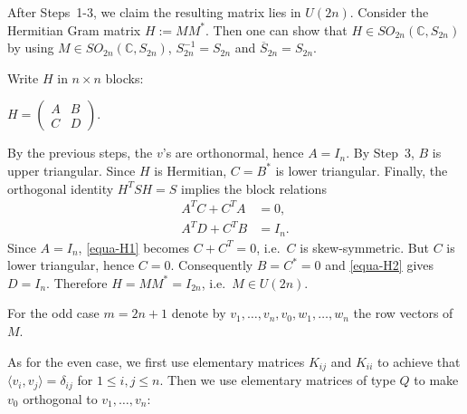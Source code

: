 \documentclass[11pt]{amsart}
\newtheorem{lemma}[theorem]{Lemma}
\theoremstyle{definition}
\theoremstyle{remark}
\theoremstyle{remark}
\begin{document}
After Steps~1-3, we claim the resulting matrix lies in $U(2n)$.
Consider the Hermitian Gram matrix $H:=MM^\ast.$
Then one can show that $H\in SO_{2n}(\mathbb{C}, S_{2n})$ by using $M \in SO_{2n}(\mathbb{C}, S_{2n})$, $S_{2n}^{-1} = S_{2n}$ and $\overline{S}_{2n} = S_{2n}$. 



Write $H$ in $n\times n$ blocks:
\begin{center}
$H=\begin{pmatrix}A&B\\ C&D\end{pmatrix}.$
\end{center}
By the previous steps, the $v$'s are orthonormal, hence $A=I_n$. By Step~3, $B$ is upper triangular.
Since $H$ is Hermitian, $C=B^\ast$ is lower triangular. Finally, the orthogonal identity $H^TSH=S$
implies the block relations
\begin{align}
A^T C + C^T A &= 0, \label{equa-H1}\\
A^T D + C^T B &= I_n. \label{equa-H2}
\end{align}
Since $A=I_n$, \eqref{equa-H1} becomes $C+C^T=0$, i.e.\ $C$ is skew-symmetric. But $C$ is lower triangular,
hence $C=0$. Consequently $B=C^\ast=0$ and \eqref{equa-H2} gives $D=I_n$. Therefore $H= MM^\ast=I_{2n}$,
i.e.\  $M\in U(2n)$.


\medskip
For the odd case $m = 2n+1$ denote  by $v_1, \dots, v_n, v_0, w_1, \dots, w_n$ the row vectors of $M$.

As for the even case, we first use elementary matrices $K_{ij}$ and $K_{ii}$ to achieve that
$\langle v_i,v_j\rangle=\delta_{ij}$ for
$ 1\leq i,j\leq n$. Then we use elementary matrices of type $Q$ to make $v_0$ orthogonal to $v_1,
\dots,v_n$:
\end{document}
